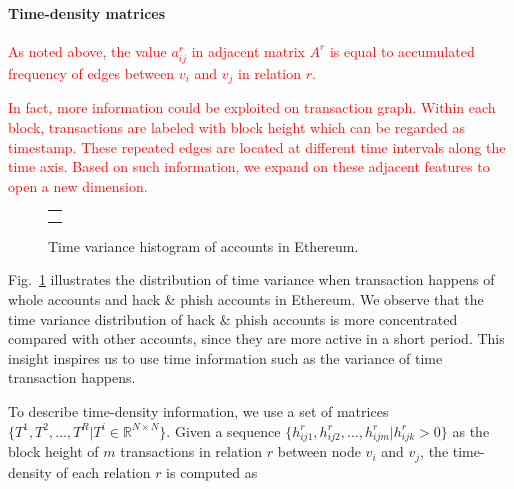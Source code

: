 \paragraph{Time-density matrices}
\textcolor{red}{As noted above, the value $a^r_{ij}$ in adjacent matrix $A^r$ is equal to accumulated frequency of edges between $v_i$ and $v_j$ in relation $r$. }


\textcolor{red}{In fact, more information could be exploited on transaction graph. Within each block, transactions are labeled with block height which can be regarded as timestamp. These repeated edges are located at different time intervals along the time axis. Based on such information, we expand on these adjacent features to open a new dimension.}


 
\begin{figure}[htbp]
\centering
\begin{tabular}{c}
	\subfigure[Time variance histogram of whole nodes.]{
		\label{fig:high_order}
    
	}\\
	\subfigure[Time variance histogram of hack\&phish nodes.]{
		\label{fig:asymmetric}
    
	}
\end{tabular}
\caption{Time variance histogram of accounts in Ethereum.}
\label{fig:time_std}
\end{figure}

Fig.~\ref{fig:time_std} illustrates the distribution of time variance when transaction happens of whole accounts and hack \& phish accounts in Ethereum. We observe that the time variance distribution of hack \& phish accounts is more concentrated compared with other accounts, since they are more active in a short period. This insight inspires us to use time information such as the variance of time transaction happens.

To describe time-density information, we use a set of matrices $\{T^1,T^2,\dots,T^R|T^i\in \mathbb{R}^{N \times N}\}$. Given a sequence $\{h_{ij1}^r,h_{ij2}^r,\dots,h_{ijm}^r | h_{ijk}^r>0\}$ as the block height of $m$ transactions in relation $r$ between node $v_i$ and $v_j$, the time-density of each relation $r$ is computed as%

